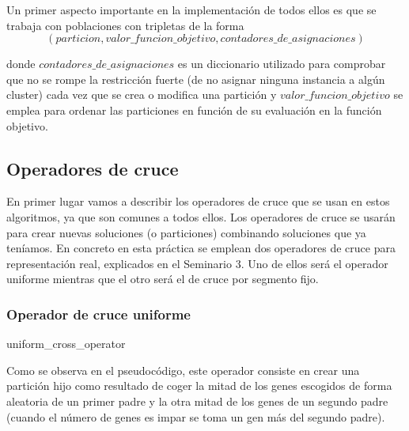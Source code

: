 \documentclass[11pt,a4paper]{article}
\begin{document}
	Un primer aspecto importante en la implementación de todos ellos es que se trabaja con poblaciones con tripletas de la forma 
	$$(particion, valor\_funcion\_objetivo, contadores\_de\_asignaciones)$$
	
	donde $contadores\_de\_asignaciones$ es un diccionario utilizado para comprobar que no se rompe la restricción fuerte (de no asignar ninguna instancia a algún cluster) cada vez que se crea o modifica una partición y $valor\_funcion\_objetivo$ se emplea para ordenar las particiones en función de su evaluación en la función objetivo.
	\subsection{Operadores de cruce}
	En primer lugar vamos a describir los operadores de cruce que se usan en estos algoritmos, ya que son comunes a todos ellos. Los operadores de cruce se usarán para crear nuevas soluciones (o particiones) combinando soluciones que ya teníamos. En concreto en esta práctica se emplean dos operadores de cruce para representación real, explicados en el Seminario 3. Uno de ellos será el operador uniforme mientras que el otro será el de cruce por
    segmento fijo.
    \subsubsection{Operador de cruce uniforme}
    
    \begin{algorithm}[H]
	 	\caption{uniform\_cross\_operator}
	\end{algorithm} 
    Como se observa en el pseudocódigo, este operador consiste en crear una partición hijo como resultado de coger la mitad de los genes escogidos de forma aleatoria de un primer padre y la otra mitad de los genes de un segundo padre (cuando el número de genes es impar se toma un gen más del segundo padre).
\end{document}
